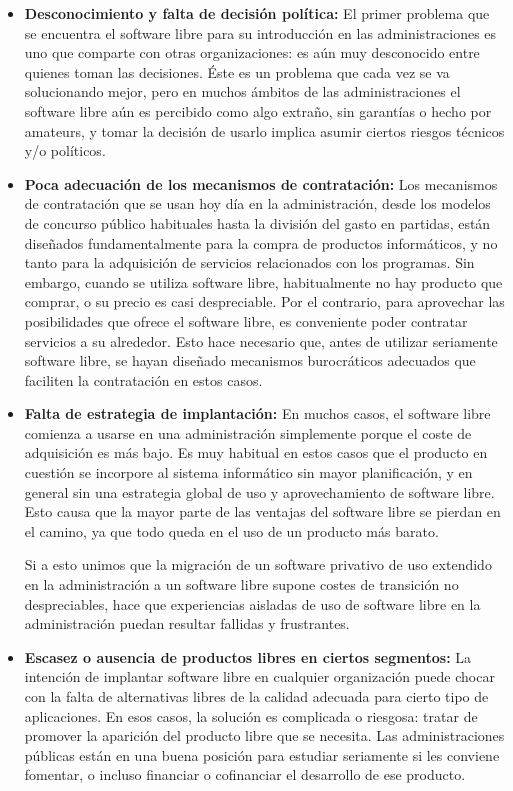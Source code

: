\begin{itemize}

\item \textbf{Desconocimiento y falta de decisión política:} El primer problema que se encuentra el software libre para su introducción en las administraciones es uno que comparte con otras organizaciones: es aún muy desconocido entre quienes toman las decisiones. Éste es un problema que cada vez se va solucionando mejor, pero en muchos ámbitos de las administraciones el software libre aún es percibido como algo extraño, sin garantías o hecho por amateurs, y tomar la decisión de usarlo implica asumir ciertos riesgos técnicos y/o políticos.

\item \textbf{Poca adecuación de los mecanismos de contratación:} Los mecanismos de contratación que se usan hoy día en la administración, desde los modelos de concurso público habituales hasta la división del gasto en partidas, están diseñados fundamentalmente para la compra de productos informáticos, y no tanto para la adquisición de servicios relacionados con los programas. Sin embargo, cuando se utiliza software libre, habitualmente no hay producto que comprar, o su precio es casi despreciable. Por el contrario, para aprovechar las posibilidades que ofrece el software libre, es conveniente poder contratar servicios a su alrededor. Esto hace necesario que, antes de utilizar seriamente software libre, se hayan diseñado mecanismos burocráticos adecuados que faciliten la contratación en estos casos.

\item \textbf{Falta de estrategia de implantación:} En muchos casos, el software libre comienza a usarse en una administración simplemente porque el coste de adquisición es más bajo. Es muy habitual en estos casos que el producto en cuestión se incorpore al sistema informático sin mayor planificación, y en general sin una estrategia global de uso y aprovechamiento de software libre. Esto causa que la mayor parte de las ventajas del software libre se pierdan en el camino, ya que todo queda en el uso de un producto más barato.

Si a esto unimos que la migración de un software privativo de uso extendido en la administración a un software libre supone costes de transición no despreciables, hace que experiencias aisladas de uso de software libre en la administración puedan resultar fallidas y frustrantes.

\item \textbf{Escasez o ausencia de productos libres en ciertos segmentos:} La intención de implantar software libre en cualquier organización puede chocar con la falta de alternativas libres de la calidad adecuada para cierto tipo de aplicaciones. En esos casos, la solución es complicada o riesgosa: tratar de promover la aparición del producto libre que se necesita. Las administraciones públicas están en una buena posición para estudiar seriamente si les conviene fomentar, o incluso financiar o cofinanciar el desarrollo de ese producto.

\end{itemize}

